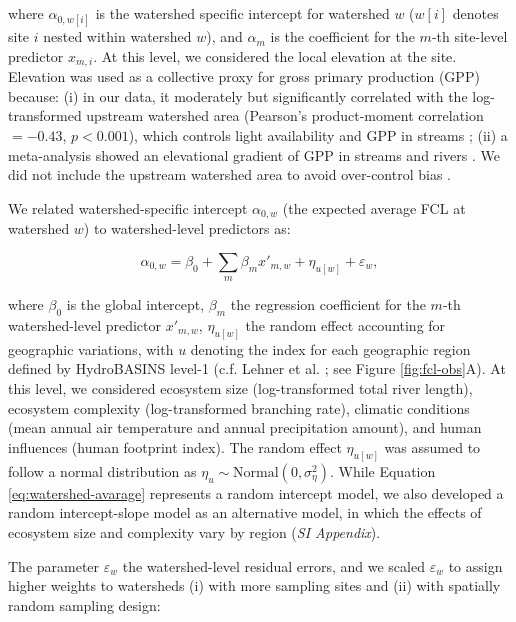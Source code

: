 \documentclass[11pt, class=article, crop=false]{standalone}
\begin{document}
where $\alpha_{0, w[i]}$ is the watershed specific intercept for watershed $w$ ($w[i]$ denotes site $i$ nested within watershed $w$), and $\alpha_m$ is the coefficient for the $m$-th site-level predictor $x_{m, i}$.
At this level, we considered the local elevation at the site. 
Elevation was used as a collective proxy for gross primary production (GPP) because: (i) in our data, it moderately but significantly correlated with the log-transformed upstream watershed area (Pearson's product-moment correlation $= -0.43$, $p < 0.001$), which controls light availability and GPP in streams \citep{finlay_light-mediated_2011, finlay_stream_2011, bernhardt_light_2022}; (ii) a meta-analysis showed an elevational gradient of GPP in streams and rivers \citep{marzolf_ecosystem_2021}.
We did not include the upstream watershed area to avoid over-control bias \citep{arif_predictive_2022}.

We related watershed-specific intercept $\alpha_{0, w}$ (the expected average FCL at watershed $w$) to watershed-level predictors as:

\begin{equation}
    \alpha_{0, w} = \beta_0 + \sum_m \beta_m x'_{m, w} + \eta_{u[w]} + \varepsilon_{w},
    \label{eq:watershed-avarage}
\end{equation}

where $\beta_0$ is the global intercept, $\beta_m$ the regression coefficient for the $m$-th watershed-level predictor $x'_{m, w}$, $\eta_{u[w]}$ the random effect accounting for geographic variations, with $u$ denoting the index for each geographic region defined by HydroBASINS level-1 (c.f. Lehner et al. \citep{lehner_global_2013}; see Figure \ref{fig:fcl-obs}A).
At this level, we considered ecosystem size (log-transformed total river length), ecosystem complexity (log-transformed branching rate), climatic conditions (mean annual air temperature and annual precipitation amount), and human influences (human footprint index).
The random effect $\eta_{u[w]}$ was assumed to follow a normal distribution as $\eta_{u} \sim \mbox{Normal}(0, \sigma_{\eta}^2)$.
While Equation \ref{eq:watershed-avarage} represents a random intercept model, we also developed a random intercept-slope model as an alternative model, in which the effects of ecosystem size and complexity vary by region (\textit{SI Appendix}).

The parameter $\varepsilon_w$ the watershed-level residual errors, and we scaled $\varepsilon_w$ to assign higher weights to watersheds (i) with more sampling sites and (ii) with spatially random sampling design:
\end{document}
